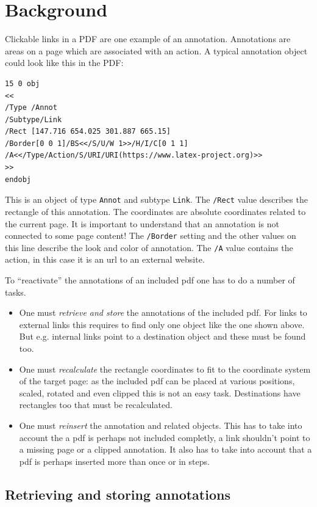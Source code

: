 \documentclass[DIV=12,parskip=half-,bibliography=totoc]{scrartcl}
\begin{document}
\section{Background}

Clickable links in a PDF are one example of an annotation. Annotations are areas on a page which are associated with an action. A typical annotation object could look like this in the PDF:

\begin{lstlisting}
15 0 obj
<<
/Type /Annot
/Subtype/Link
/Rect [147.716 654.025 301.887 665.15]
/Border[0 0 1]/BS<</S/U/W 1>>/H/I/C[0 1 1]
/A<</Type/Action/S/URI/URI(https://www.latex-project.org)>>
>>
endobj
\end{lstlisting}
This is an object of type \texttt{Annot} and subtype \texttt{Link}.
The \texttt{/Rect} value describes the rectangle of this annotation.  The coordinates are absolute coordinates related to the current page. It is important to understand that an annotation is not connected to some page content!
The \texttt{/Border} setting and the other values on this line describe the look and color of annotation. The \texttt{/A} value contains the action, in this case it is an url to an external website.


To \enquote{reactivate} the annotations of an included pdf one has to do a number of tasks.
\begin{itemize}
\item One must \emph{retrieve and store} the annotations of the included pdf. For links to external links this requires to find only one object like the one shown above. But e.g. internal links point to a destination object and these must be found too.
\item One must \emph{recalculate} the rectangle coordinates to fit to the coordinate system of the target page: as the included pdf can be placed at various positions, scaled, rotated and even clipped this is not an easy task. Destinations have rectangles too that must be recalculated.
\item  One must  \emph{reinsert} the annotation and related objects. This has to take into account the a pdf is perhaps not included completly, a link shouldn't point to a missing page or a clipped annotation. It also has to take into account that a pdf is perhaps inserted more than once or in steps.
\end{itemize}

\subsection{Retrieving and storing annotations}
\end{document}

